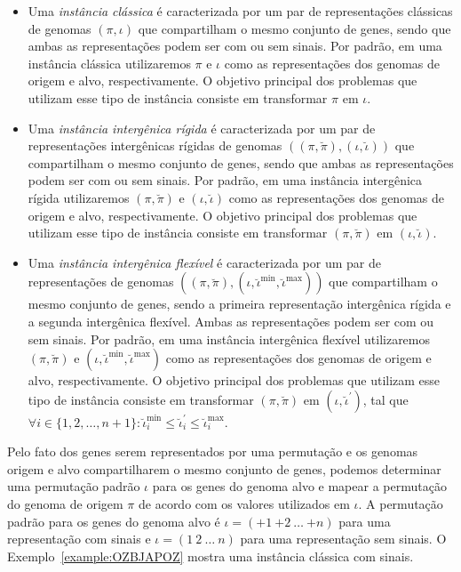 \begin{itemize}
\item Uma \emph{instância clássica} é caracterizada por um par de representações clássicas de genomas $(\pi,\iota)$ que compartilham o mesmo conjunto de genes, sendo que ambas as representações podem ser com ou sem sinais. Por padrão, em uma instância clássica utilizaremos $\pi$ e $\iota$ como as representações dos genomas de origem e alvo, respectivamente. O objetivo principal dos problemas que utilizam esse tipo de instância consiste em transformar $\pi$ em $\iota$.
\item Uma \emph{instância intergênica rígida} é caracterizada por um par de representações intergênicas rígidas de genomas $((\pi,\breve\pi),(\iota,\breve\iota))$ que compartilham o mesmo conjunto de genes, sendo que ambas as representações podem ser com ou sem sinais. Por padrão, em uma instância intergênica rígida utilizaremos $(\pi,\breve\pi)$ e $(\iota,\breve\iota)$ como as representações dos genomas de origem e alvo, respectivamente. O objetivo principal dos problemas que utilizam esse tipo de instância consiste em transformar $(\pi,\breve\pi)$ em $(\iota,\breve\iota)$.
\item Uma \emph{instância intergênica flexível} é caracterizada por um par de representações de genomas $((\pi,\breve\pi),(\iota,\breve\iota^{\min},\breve\iota^{\max}))$ que compartilham o mesmo conjunto de genes, sendo a primeira representação intergênica rígida e a segunda intergênica flexível. Ambas as representações podem ser com ou sem sinais. Por padrão, em uma instância intergênica flexível utilizaremos $(\pi,\breve\pi)$ e $(\iota,\breve\iota^{\min},\breve\iota^{\max})$ como as representações dos genomas de origem e alvo, respectivamente. O objetivo principal dos problemas que utilizam esse tipo de instância consiste em transformar $(\pi,\breve\pi)$ em $(\iota,\breve\iota^{\prime})$, tal que $\forall i \in \{1,2,\dots,{n+1}\}: \breve\iota^{\min}_i \le \breve\iota^{\prime}_i \le \breve\iota^{\max}_i$.
\end{itemize}

Pelo fato dos genes serem representados por uma permutação e os genomas origem e alvo compartilharem o mesmo conjunto de genes, podemos determinar uma permutação padrão $\iota$ para os genes do genoma alvo e mapear a permutação do genoma de origem $\pi$ de acordo com os valores utilizados em $\iota$. A permutação padrão para os genes do genoma alvo é $\iota=({+1}~{+2}~\dots~{+n})$ para uma representação com sinais e $\iota=(1~2~\dots~n)$ para uma representação sem sinais. O Exemplo~\ref{example:OZBJAPOZ} mostra uma instância clássica com sinais.

